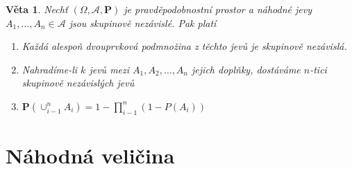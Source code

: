 \documentclass[a4]{report}
\newtheorem{theorem}{Věta}
\theoremstyle{definition}
\begin{document}
{\begin{theorem}
Nechť $( \Omega, \mathcal{A}, \textbf{P})$ je pravděpodobnostní prostor a náhodné jevy $A_1,\ldots,A_n \in \mathcal{A}$ jsou skupinově nezávislé. Pak platí
\begin{enumerate}
\item Každá alespoň dvouprvková podmnožina z těchto jevů je skupinově nezávislá.
\item Nahradíme-li $k$ jevů mezi $A_1,A_2,\ldots,A_n$ jejich doplňky, dostáváme $n$-tici skupinově nezávislých jevů
\item $\textbf{P}(\cup_{i-1}^{n} A_i)=1-\prod_{i-1}^{n}(1-P(A_i))$ 
\end{enumerate}
\end{theorem}


\section{Náhodná veličina}
}
\end{document}

